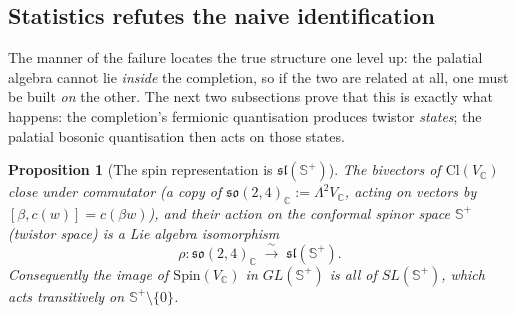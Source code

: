 \documentclass[11pt]{article}
\newtheorem{proposition}[theorem]{Proposition}
\theoremstyle{definition}
\theoremstyle{plain}
\newcommand{\changedmark}[2]{\marginpar{\raggedright\scriptsize\color{#1}#2}}
\providecommand{\C}{}\renewcommand{\C}{\mathbb{C}}
\providecommand{\CS}{}\renewcommand{\CS}{{\mathbb{S}^{+}}}
\providecommand{\Cl}{}\renewcommand{\Cl}{\mathrm{Cl}}
\begin{document}
\subsection*{Statistics refutes the naive identification}
\label{c:note.correspondence.setting-statistics-refutes-naive-identification}
The manner of the failure locates the true structure one level up: the palatial algebra cannot lie \emph{inside} the completion, so if the two are related at all, one must be built \emph{on} the other. The next two subsections prove that this is exactly what happens: the completion's fermionic quantisation produces twistor \emph{states}; the palatial bosonic quantisation then acts on those states.

\begin{proposition}[The spin representation is $\mathfrak{sl}(\CS)$]\label{c:correspondence.spin-representation}
\changedmark{gray}{reworded}
The bivectors of $\Cl(V_\C)$ close under commutator (a copy of $\mathfrak{so}(2,4)_\C := \Lambda^2 V_\C$, acting on vectors by $[\beta, c(w)] = c(\beta w)$), and their action on the conformal spinor space $\CS$ (twistor space) is a Lie algebra isomorphism
\[
\rho: \mathfrak{so}(2,4)_\C \;\xrightarrow{\ \sim\ }\; \mathfrak{sl}(\CS) .
\]
Consequently the image of $\mathrm{Spin}(V_\C)$ in $GL(\CS)$ is all of $SL(\CS)$, which acts transitively on $\CS\setminus\{0\}$.
\end{proposition}
\end{document}
